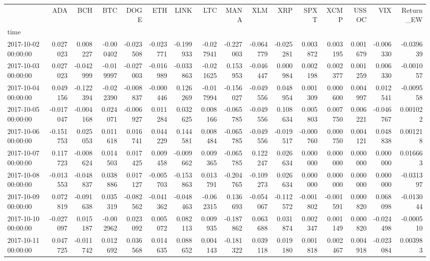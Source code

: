 \begin{tabular}{lrrrrrrrrrrrrrrr}
\toprule
 & ADA & BCH & BTC & DOGE & ETH & LINK & LTC & MANA & XLM & XRP & SPXT & XCMP & USSOC & VIX & Return_EW \\
time &  &  &  &  &  &  &  &  &  &  &  &  &  &  &  \\
\midrule
2017-10-02 00:00:00 & 0.027023 & 0.008227 & -0.000402 & -0.023508 & -0.023771 & -0.199933 & -0.027941 & -0.227003 & -0.064779 & -0.025281 & 0.003872 & 0.003195 & 0.001679 & -0.006330 & -0.039639 \\
2017-10-03 00:00:00 & 0.027023 & -0.042999 & -0.019997 & -0.027003 & -0.016989 & -0.033863 & -0.021625 & 0.153953 & -0.046447 & 0.000984 & 0.002198 & 0.002377 & 0.001259 & 0.006330 & -0.001057 \\
2017-10-04 00:00:00 & 0.049156 & -0.122394 & -0.022390 & -0.008837 & -0.000446 & 0.126269 & -0.017994 & -0.156027 & -0.049556 & 0.048954 & 0.001309 & 0.000600 & 0.004997 & 0.012541 & -0.009558 \\
2017-10-05 00:00:00 & -0.017047 & -0.004168 & 0.024071 & -0.006927 & 0.011284 & 0.032625 & 0.008166 & -0.065785 & -0.049556 & 0.108634 & 0.005803 & 0.007750 & 0.006221 & -0.046767 & 0.001022 \\
2017-10-06 00:00:00 & -0.151753 & 0.025053 & 0.011618 & 0.016741 & 0.044229 & 0.144581 & 0.008484 & -0.065785 & -0.049556 & -0.019517 & -0.000760 & 0.000750 & 0.004121 & 0.048838 & 0.001218 \\
2017-10-07 00:00:00 & 0.117723 & -0.008624 & 0.014503 & 0.017425 & 0.009458 & -0.009662 & 0.009365 & -0.065785 & 0.122247 & 0.026634 & 0.000000 & 0.000000 & 0.000000 & 0.000000 & 0.016663 \\
2017-10-08 00:00:00 & -0.013553 & -0.048837 & 0.038886 & 0.017127 & -0.005703 & -0.153863 & 0.013791 & -0.204765 & -0.109273 & 0.026634 & 0.000000 & 0.000000 & 0.000000 & 0.000000 & -0.031397 \\
2017-10-09 00:00:00 & 0.072819 & -0.091638 & 0.035319 & -0.082562 & -0.041362 & -0.048463 & -0.062315 & 0.136693 & -0.054067 & -0.112572 & -0.001802 & -0.001591 & 0.000820 & 0.068098 & -0.013044 \\
2017-10-10 00:00:00 & -0.027097 & 0.015187 & -0.002962 & 0.023092 & 0.005072 & 0.082113 & 0.009935 & -0.187862 & 0.063688 & 0.031874 & 0.002347 & 0.001149 & 0.000820 & -0.024498 & -0.000510 \\
2017-10-11 00:00:00 & 0.047725 & -0.011742 & 0.012692 & 0.036568 & 0.014635 & 0.088652 & 0.004143 & -0.181322 & 0.039118 & 0.019180 & 0.001818 & 0.002467 & 0.004918 & -0.023084 & 0.003983 \\

\end{tabular}
